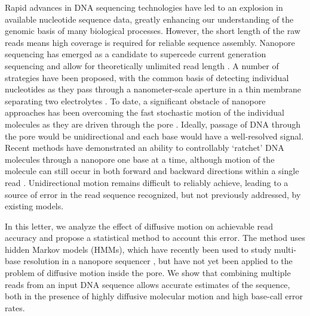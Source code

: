\documentclass{biophys_letter}
\newcommand{\kje}[1]{\textcolor{BurntOrange}{#1}}
\begin{document}
\begin{multicols}{2}

Rapid advances in DNA sequencing technologies have led to an explosion in available nucleotide sequence data, greatly enhancing our understanding of the genomic basis of many biological processes.
However, the short length of the raw reads means high coverage is required for reliable sequence assembly.
Nanopore sequencing has emerged as a candidate to supercede current generation sequencing and allow for theoretically unlimited read length \cite{Branton:2008}.
A number of strategies have been proposed, with the common basis of detecting individual nucleotides as they pass through a nanometer-scale aperture in a thin membrane separating two electrolytes \cite{Winters-Hilt:2004}.
To date, a significant obstacle of nanopore approaches has been overcoming the fast stochastic motion of the individual molecules as they are driven through the pore \cite{Venkatesan:2011, Lu:2011}.
Ideally, passage of DNA through the pore would be unidirectional and each base would have a well-resolved signal.
Recent methods have demonstrated an ability to controllably `ratchet' DNA molecules through a nanopore one base at a time, although motion of the molecule can still occur in both forward and backward directions within a single read \cite{Olasagasti:2010, Cherf:2012}.
Unidirectional motion remains difficult to reliably achieve, leading to a source of error in the read sequence recognized, but not previously addressed, by existing models.

In this letter, we analyze the effect of diffusive motion on achievable read accuracy and propose a statistical method to \kje{account} this error.
The method uses hidden Markov models (HMMs), which have recently been used to study multi-base resolution in a nanopore sequencer \cite{Timp:2012}, but have not yet been applied to the problem of diffusive motion inside the pore.
We show that combining multiple reads from an input DNA sequence allows accurate estimates of the sequence, both in the presence of highly diffusive molecular motion and high base-call error rates.


\end{multicols}
\end{document}
